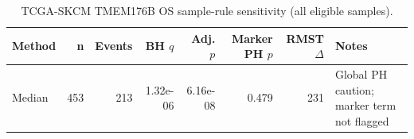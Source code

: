 \begin{table}[t]
\centering
\caption{TCGA-SKCM TMEM176B OS sample-rule sensitivity (all eligible samples).}
\label{tab:skcm-tmem176b-os-all-eligible-samples}
\begin{tabular}{lrrrrrrl}
\toprule
Method & n & Events & BH $q$ & Adj. $p$ & Marker PH $p$ & RMST $\Delta$ & Notes \\
\midrule
Median & 453 & 213 & 1.32e-06 & 6.16e-08 & 0.479 & 231 & Global PH caution; marker term not flagged \\
\bottomrule
\end{tabular}
\end{table}
